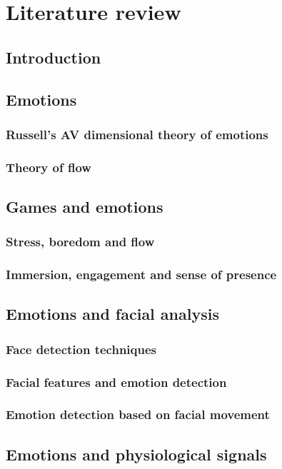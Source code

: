\chapter{Literature review}

\section{Introduction}
\section{Emotions}
  \subsection{Russell's AV dimensional theory of emotions}
  \subsection{Theory of flow}
\section{Games and emotions}
  \subsection{Stress, boredom and flow}
  \subsection{Immersion, engagement and sense of presence}
\section{Emotions and facial analysis}
  \subsection{Face detection techniques}
  \subsection{Facial features and emotion detection}
  \subsection{Emotion detection based on facial movement}
\section{Emotions and physiological signals}
